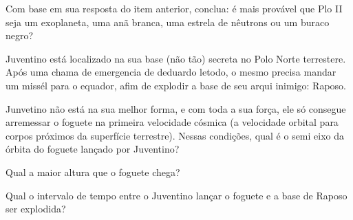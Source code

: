 \documentclass[11pt]{article}
\begin{document}
\begin{pproblem}
\begin{alternativas}
        \item Com base em sua resposta do item anterior, conclua: é mais provável que Plo II seja um exoplaneta, uma anã branca, uma estrela de nêutrons ou um buraco negro?
    \end{alternativas}

\begin{pproblem} Juventino está localizado na sua base (não tão) secreta no Polo Norte terrestere. Após uma chama de emergencia de deduardo letodo, o mesmo precisa mandar um missél para o equador, afim de explodir a base de seu arqui inimigo: Raposo. 
    \begin{alternativas}
        \item Junvetino não está na sua melhor forma, e com toda a sua força, ele só consegue arremessar o foguete na primeira velocidade cósmica (a velocidade orbital para corpos próximos da superfície terrestre). Nessas condições, qual é o semi eixo da órbita do foguete lançado por Juventino?
        \item Qual a maior altura que o foguete chega?
        \item Qual o intervalo de tempo entre o Juventino lançar o foguete e a base de Raposo ser explodida?
    \end{alternativas}
    
\end{pproblem}
    
    
    
\end{pproblem}
\end{document}
